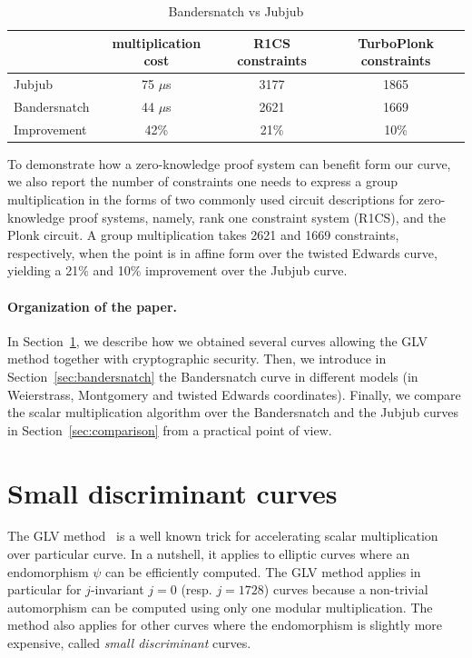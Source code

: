 \documentclass[version=preprint]{iacrcc}
\begin{document}
\begin{table}[ht] %
  \centering
  
  \begin{tabular}{|l|c|c|c|}\hline
      & multiplication cost & R1CS constraints & TurboPlonk constraints  \\\hline\hline
    Jubjub & 75 $\mu$s  & 3177 &  1865\\\hline
    Bandersnatch & 44 $\mu$s  & 2621 & 1669\\\hline\hline   
    Improvement & 42\% & 21\% & 10\%\\\hline
  \end{tabular}
  \caption{Bandersnatch vs Jubjub}
  \label{tab:comp}
\end{table}

To demonstrate how a zero-knowledge proof system can benefit
form our curve, we also report the number of 
constraints one needs to express a group multiplication
in the forms of 
two commonly used circuit descriptions for zero-knowledge 
proof systems, namely,
rank one constraint system (R1CS), 
and the Plonk circuit.
A group multiplication takes 
2621 and 1669
constraints, respectively, when the point is in affine form over the 
twisted Edwards curve,
yielding a 21\% and 10\% improvement over the Jubjub curve.

\paragraph{Organization of the paper.}
In Section~\ref{sec:small-disc-curves}, we describe how we obtained
several curves allowing the GLV method together with cryptographic
security.
Then, we introduce in Section~\ref{sec:bandersnatch} the Bandersnatch
curve in different models (in Weierstrass, Montgomery and twisted Edwards
coordinates).
Finally, we compare the scalar multiplication algorithm over
the Bandersnatch and the Jubjub curves in
Section~\ref{sec:comparison} from a practical point of view.


\section{Small discriminant curves}\label{sec:small-disc-curves}

The GLV method~\cite{C:GalLamVan01} is a well known trick for accelerating
scalar multiplication over particular curve. In a nutshell, it applies
to elliptic curves where an endomorphism $\psi$ can be efficiently computed.
The GLV method applies in particular for $j$-invariant $j=0$
(resp. $j=1728$) curves because a non-trivial automorphism can be
computed using only one modular multiplication. %
The method also applies for other curves where the endomorphism is
slightly more expensive, called \emph{small discriminant} curves.
\end{document}

